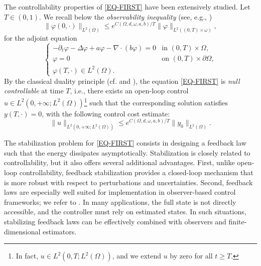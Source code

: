 \documentclass[a4paper]{article}
\numberwithin{equation}{section}
\begin{document}
The controllability properties of \eqref{EQ-FIRST} have been extensively studied. Let $T\in (0,1)$. We recall below the \textit{observability inequality} (see, e.g., \cite[Theorem 3.5]{FZL})
\begin{equation}\label{OBS-INTRO}
\|\varphi(0,\cdot)\|_{L^2(\Omega)}\le e^{C\left(\Omega,d,\omega,a,b\right)/T} \|\varphi\|_{L^2((0,T)\times \omega)},
\end{equation}
for the adjoint equation
\begin{equation}\label{ADJOINT-INTRO-FIR}
\begin{cases}
-\partial_t \varphi - \Delta \varphi + a\varphi - \nabla \cdot (b\varphi)=0 & \text{in } (0,T)\times \Omega,\\
\varphi=0 & \text{on }(0,T)\times \partial\Omega,\\
\varphi(T,\cdot) \in L^2(\Omega).
\end{cases}
\end{equation}
By the classical duality principle (cf. \cite{TW} and \cite[Section 2.3]{Coron}), the equation \eqref{EQ-FIRST} is \textit{null controllable} at time $T$, i.e., there exists an open-loop control $u\in L^2(0,+\infty;L^2(\Omega))$\footnote{In fact, $u\in L^2(0,T;L^2(\Omega))$, and we extend $u$ by zero for all $t\ge T$.} such that the corresponding solution satisfies $y(T,\cdot)=0$, with the following control cost estimate:
\begin{equation}\label{C-COST-INTRO}
\|u\|_{ L^2(0,+\infty;L^2(\Omega))}\le e^{C\left(\Omega,d,\omega,a,b\right)/T}\|y_0\|_{L^2(\Omega)}.
\end{equation}

The stabilization problem for \eqref{EQ-FIRST} consists in designing a feedback law such that the energy dissipates asymptotically. Stabilization is closely related to controllability, but it also offers several additional advantages. First, unlike open-loop controllability, feedback stabilization provides a closed-loop mechanism that is more robust with respect to perturbations and uncertainties. Second, feedback laws are especially well suited for implementation in observer-based control frameworks; we refer to \cite{KF,LP1}. In many applications, the full state is not directly accessible, and the controller must rely on estimated states. In such situations, stabilizing feedback laws can be effectively combined with observers and finite-dimensional estimators.
\end{document}
